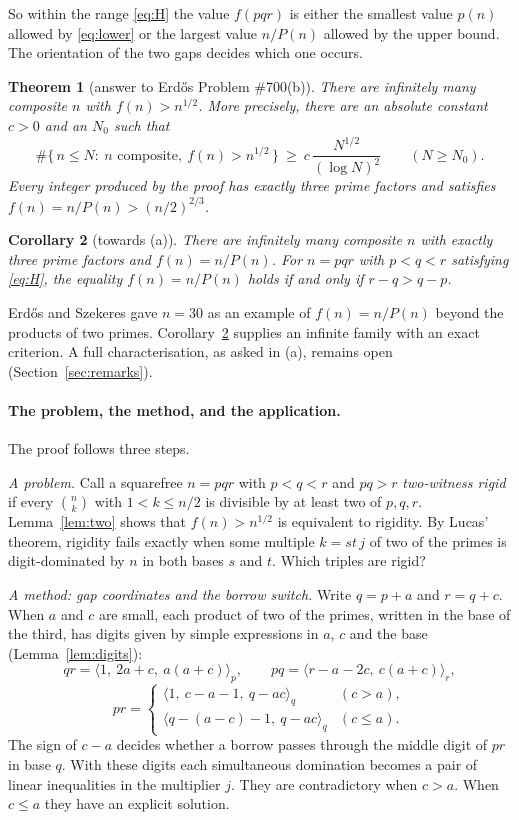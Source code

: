 \documentclass[11pt,a4paper]{article}
\newtheorem{theorem}{Theorem}[section]
\newtheorem{corollary}[theorem]{Corollary}
\theoremstyle{definition}
\newcommand{\bin}[2]{\binom{#1}{#2}}
\newcommand{\dig}[1]{\langle #1\rangle}
\begin{document}
So within the range \eqref{eq:H} the value $f(pqr)$ is either the smallest value $p(n)$ allowed by \eqref{eq:lower} or the largest value $n/P(n)$ allowed by the upper bound. The orientation of the two gaps decides which one occurs.

\begin{theorem}[answer to Erd\H{o}s Problem \#700(b)]\label{thm:b}
There are infinitely many composite $n$ with $f(n)>n^{1/2}$. More precisely, there are an absolute constant $c>0$ and an $N_0$ such that
\[
\#\{\,n\le N:\ n\text{ composite},\ f(n)>n^{1/2}\,\}\ \ge\ c\,\frac{N^{1/2}}{(\log N)^{2}}\qquad(N\ge N_0).
\]
Every integer produced by the proof has exactly three prime factors and satisfies $f(n)=n/P(n)>(n/2)^{2/3}$.
\end{theorem}

\begin{corollary}[towards (a)]\label{cor:a}
There are infinitely many composite $n$ with exactly three prime factors and $f(n)=n/P(n)$. For $n=pqr$ with $p<q<r$ satisfying \eqref{eq:H}, the equality $f(n)=n/P(n)$ holds if and only if $r-q>q-p$.
\end{corollary}

Erd\H{o}s and Szekeres gave $n=30$ as an example of $f(n)=n/P(n)$ beyond the products of two primes. Corollary~\ref{cor:a} supplies an infinite family with an exact criterion. A full characterisation, as asked in (a), remains open (Section~\ref{sec:remarks}).

\paragraph{The problem, the method, and the application.}
The proof follows three steps.

\emph{A problem.} Call a squarefree $n=pqr$ with $p<q<r$ and $pq>r$ \emph{two-witness rigid} if every $\bin nk$ with $1<k\le n/2$ is divisible by at least two of $p,q,r$. Lemma~\ref{lem:two} shows that $f(n)>n^{1/2}$ is equivalent to rigidity. By Lucas' theorem, rigidity fails exactly when some multiple $k=st\,j$ of two of the primes is digit-dominated by $n$ in both bases $s$ and $t$. Which triples are rigid?

\emph{A method: gap coordinates and the borrow switch.} Write $q=p+a$ and $r=q+c$. When $a$ and $c$ are small, each product of two of the primes, written in the base of the third, has digits given by simple expressions in $a$, $c$ and the base (Lemma~\ref{lem:digits}):
\[
qr=\dig{1,\ 2a+c,\ a(a+c)}_p,\qquad pq=\dig{r-a-2c,\ c(a+c)}_r,
\]
\[
pr=\begin{cases}\dig{1,\ c-a-1,\ q-ac}_q & (c>a),\\ \dig{q-(a-c)-1,\ q-ac}_q & (c\le a).\end{cases}
\]
The sign of $c-a$ decides whether a borrow passes through the middle digit of $pr$ in base $q$. With these digits each simultaneous domination becomes a pair of linear inequalities in the multiplier $j$. They are contradictory when $c>a$. When $c\le a$ they have an explicit solution.
\end{document}
